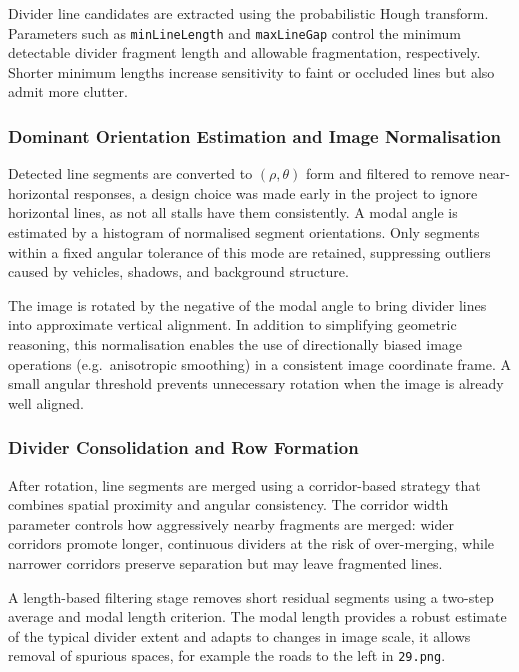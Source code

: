 \documentclass[9pt,journal]{IEEEtran}
\begin{document}
	Divider line candidates are extracted using the probabilistic Hough transform. Parameters such as \texttt{minLineLength} and \texttt{maxLineGap} control the minimum detectable divider fragment length and allowable fragmentation, respectively. Shorter minimum lengths increase sensitivity to faint or occluded lines but also admit more clutter.
	
	\subsubsection{Dominant Orientation Estimation and Image Normalisation}
	
	Detected line segments are converted to $(\rho,\theta)$ form and filtered to remove near-horizontal responses, a design choice was made early in the project to ignore horizontal lines, as not all stalls have them consistently. A modal angle is estimated by a histogram of normalised segment orientations. Only segments within a fixed angular tolerance of this mode are retained, suppressing outliers caused by vehicles, shadows, and background structure.
	
	The image is rotated by the negative of the modal angle to bring divider lines into approximate vertical alignment. In addition to simplifying geometric reasoning, this normalisation enables the use of directionally biased image operations (e.g.\ anisotropic smoothing) in a consistent image coordinate frame. A small angular threshold prevents unnecessary rotation when the image is already well aligned.

	
	\subsubsection{Divider Consolidation and Row Formation}
	
	After rotation, line segments are merged using a corridor-based strategy that combines spatial proximity and angular consistency. The corridor width parameter controls how aggressively nearby fragments are merged: wider corridors promote longer, continuous dividers at the risk of over-merging, while narrower corridors preserve separation but may leave fragmented lines.
	
	A length-based filtering stage removes short residual segments using a two-step average and modal length criterion. The modal length provides a robust estimate of the typical divider extent and adapts to changes in image scale, it allows removal of spurious spaces, for example the roads to the left in \texttt{29.png}. 
	
\end{document}
